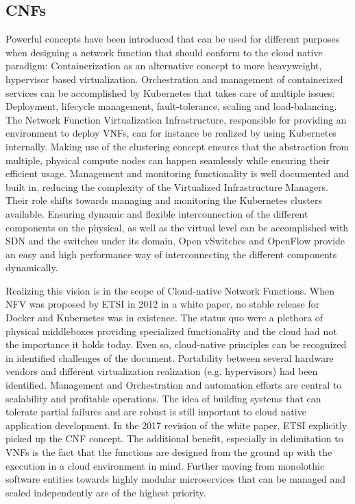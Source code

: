 \subsection{CNFs}
Powerful concepts have been introduced that can be used for different purposes when designing a network function that should conform to the cloud native paradigm: Containerization as an alternative concept to more heavyweight, hypervisor based virtualization. Orchestration and management of containerized services can be accomplished by Kubernetes that takes care of multiple issues: Deployment, lifecycle management, fault-tolerance, scaling and load-balancing. The Network Function Virtualization Infrastructure, responsible for providing an environment to deploy VNFs, can for instance be realized by using Kubernetes internally. Making use of the clustering concept ensures that the abstraction from multiple, physical compute nodes can happen seamlessly while ensuring their efficient usage. Management and monitoring functionality is well documented and built in, reducing the complexity of the Virtualized Infrastructure Managers. Their role shifts towards managing and monitoring the Kubernetes clusters available. Ensuring dynamic and flexible interconnection of the different components on the physical, as well as the virtual level can be accomplished with SDN and the switches under its domain. Open vSwitches and OpenFlow provide an easy and high performance way of interconnecting the different components dynamically. 

Realizing this vision is in the scope of Cloud-native Network Functions. When NFV was proposed by ETSI in 2012 in a white paper, no stable release for Docker and Kubernetes was in existence. The status quo were a plethora of physical middleboxes providing specialized functionality and the cloud had not the importance it holds today. Even so, cloud-native principles can be recognized in identified challenges of the document. Portability between several hardware vendors and different virtualization realization (e.g. hypervisors) had been identified. Management and Orchestration and automation efforts are central to scalability and profitable operations. The idea of building systems that can tolerate partial failures and are robust is still important to cloud native application development.
In the 2017 revision of the white paper, ETSI explicitly picked up the CNF concept. The additional benefit, especially in delimitation to VNFs is the fact that the functions are designed from the ground up with the execution in a cloud environment in mind. Further moving from monolothic software entities towards highly modular microservices that can be managed and scaled independently are of the highest priority.

